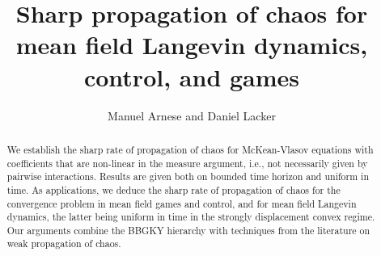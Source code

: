 \documentclass[11pt,reqno]{amsart}
\numberwithin{equation}{section}
\theoremstyle{definition}
\begin{document}
\title[Sharp chaos for mean field Langevin, control, and games]{Sharp propagation of chaos for mean field Langevin dynamics, control, and games}

\begin{abstract}
We establish the sharp rate of propagation of chaos for McKean-Vlasov equations with coefficients that are non-linear in the measure argument, i.e., not necessarily given by pairwise interactions. Results are given both on bounded time horizon and uniform in time. As applications, we deduce the sharp rate of propagation of chaos for the convergence problem in mean field games and control, and for mean field Langevin dynamics, the latter being uniform in time in the strongly displacement convex regime. Our arguments combine the BBGKY hierarchy with techniques from the literature on weak propagation of chaos.
\end{abstract}

\author{Manuel Arnese and Daniel Lacker}

\maketitle
\end{document}
